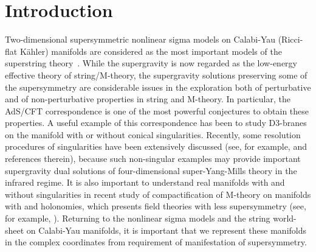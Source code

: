 \documentclass[a4paper,11pt]{article}
\begin{document}
{\begin{titlepage}
\begin{abstract}
\end{abstract}

\end{titlepage}



\section{Introduction} \label{intro}

Two-dimensional \coordHE{} supersymmetric nonlinear sigma models 
on Calabi-Yau (Ricci-flat K\"{a}hler) manifolds 
are considered as the most important models 
of the superstring theory~\cite{Zu,finite,GVZ,NS}. 
While the supergravity is 
now regarded as the low-energy effective theory of string/M-theory, 
the supergravity solutions preserving some of the supersymmetry 
are considerable issues in the exploration both
of perturbative and of non-perturbative properties 
in string and M-theory. 
In particular,
the AdS/CFT correspondence is one of the most powerful conjectures
to obtain these properties.
A useful example of this correspondence has been to study D3-branes on
the manifold with or without conical singularities.  
Recently, 
some resolution procedures of singularities have been extensively
discussed 
(see, for example, \cite{KleTsey,KleStr,PT,CLP,PapTsey,CGLP} 
and references therein),
because 
such non-singular examples may provide important supergravity dual
solutions of four-dimensional \coordHE{} super-Yang-Mills theory in
the infrared regime.  
It is also important to understand real manifolds 
with and without singularities 
in recent study of compactification of M-theory on 
manifolds with
\coordHE{} and \coordHE{} holonomies, which presents 
field theories with less supersymmetry 
(see, for example,
\cite{Spin7,Ach,ES,AW,GLPS}). 
Returning to
the nonlinear sigma models and the string world-sheet 
on Calabi-Yau manifolds, 
it is important that we represent these manifolds in 
the complex coordinates from requirement of 
manifestation of supersymmetry. 

}
\end{document}
